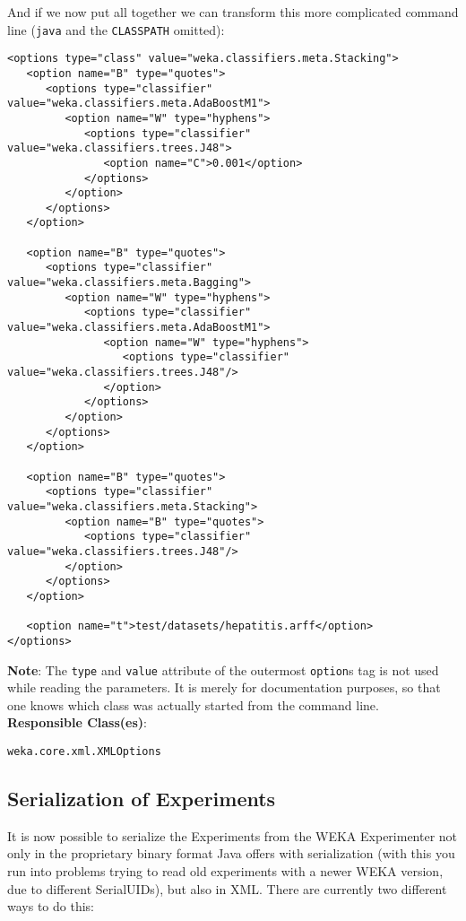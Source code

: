 \newpage
\noindent And if we now put all together we can transform this more complicated
command line (\verb=java= and the \verb=CLASSPATH= omitted):

{\small \begin{verbatim}
<options type="class" value="weka.classifiers.meta.Stacking">
   <option name="B" type="quotes">
      <options type="classifier" value="weka.classifiers.meta.AdaBoostM1">
         <option name="W" type="hyphens">
            <options type="classifier" value="weka.classifiers.trees.J48">
               <option name="C">0.001</option>
            </options>
         </option>
      </options>
   </option>
   
   <option name="B" type="quotes">
      <options type="classifier" value="weka.classifiers.meta.Bagging">
         <option name="W" type="hyphens">
            <options type="classifier" value="weka.classifiers.meta.AdaBoostM1">
               <option name="W" type="hyphens">
                  <options type="classifier" value="weka.classifiers.trees.J48"/>
               </option>
            </options>
         </option>
      </options>
   </option>

   <option name="B" type="quotes">
      <options type="classifier" value="weka.classifiers.meta.Stacking">
         <option name="B" type="quotes">
            <options type="classifier" value="weka.classifiers.trees.J48"/>
         </option>
      </options>
   </option>

   <option name="t">test/datasets/hepatitis.arff</option>
</options>
\end{verbatim}}

\noindent \textbf{Note}: The \verb=type= and \verb=value= attribute of the
outermost
\verb=option=s tag is not used while reading the parameters. It is merely for
documentation purposes, so that one knows which class was actually
started from the command line.\\

\noindent \textbf{Responsible Class(es)}:

\begin{verbatim}
weka.core.xml.XMLOptions
\end{verbatim}

\newpage
\subsection{Serialization of Experiments}
It is now possible to serialize the Experiments from the WEKA
Experimenter not only in the proprietary binary format Java offers
with serialization (with this you run into problems trying to read old
experiments with a newer WEKA version, due to different SerialUIDs),
but also in XML. There are currently two different ways to do this:

